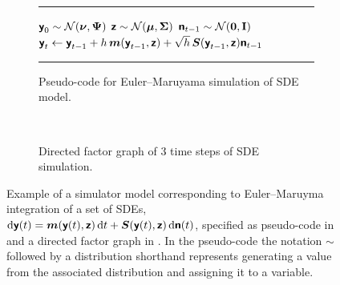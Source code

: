 \begin{figure}[!t]
\centering
\begin{subfigure}[b]{\linewidth}
\vskip 0pt
\centering
\hrule
\vskip 3pt
\begin{algorithmic}
\small
\State $\rvct{y}_0 \sim \nrm{\vct{\nu},\mtx{\Psi}}$
\State $\rvct{z} \sim \nrm{\vct{\mu},\mtx{\Sigma}}$
  \State $\rvct{n}_{t-1} \sim \nrm{\vct{0},\mathbf{I}}$
  \State $\boldsymbol{\mathsf{y}}_{t} \gets \boldsymbol{\mathsf{y}}_{t-1} + h \, \boldsymbol{m}(\boldsymbol{\mathsf{y}}_{t-1},\boldsymbol{\mathsf{z}}) + \sqrt{h} \, \boldsymbol{S}(\boldsymbol{\mathsf{y}}_{t-1},\boldsymbol{\mathsf{z}})\boldsymbol{\mathsf{n}}_{t-1}$
\EndFor
\end{algorithmic}
\vskip 3pt
\hrule
\vskip 3pt
\captionsetup{justification=centering}
\caption{Pseudo-code for Euler--Maruyama simulation of \ac{SDE} model. } %
\label{sfig:sim-model-code} %
\end{subfigure}%
\\[2ex]
\begin{subfigure}[b]{\linewidth}
\vskip 0pt
\centering
{}
\caption{Directed factor graph of 3 time steps of \ac{SDE} simulation.}
\label{sfig:sim-model-factor-graph}
\end{subfigure}%
\caption[Simulator model example.]{Example of a simulator model corresponding to Euler--Maruyma integration of a set of \acfp{SDE}, \\$\dr \rvct{y}(t) = \vct{m}\lpa\rvct{y}(t),\rvct{z}\rpa \,\dr t + \mtx{S}\lpa\rvct{y}(t),\rvct{z}\rpa \, \dr\rvct{n}(t)$, specified as pseudo-code in  and a directed factor graph in . In the pseudo-code the notation $\sim$ followed by a distribution shorthand represents generating a value from the associated distribution and assigning it to a variable.} %
\label{fig:simulator-model-example}
\end{figure}


